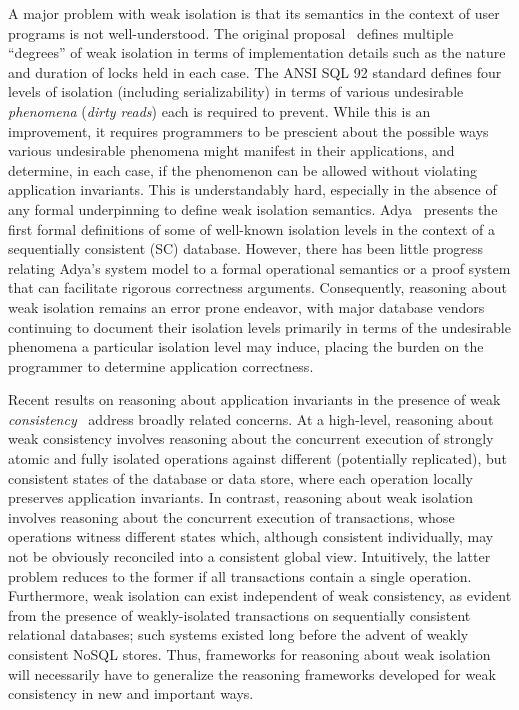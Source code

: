 A major problem with weak isolation is that its semantics in the
context of user programs is not well-understood. The original
proposal~\cite{gray1976} defines multiple ``degrees'' of weak
isolation in terms of implementation details such as the nature and
duration of locks held in each case. The ANSI SQL 92 standard defines
four levels of isolation (including serializability) in terms of
various undesirable \emph{phenomena} (\eg \emph{dirty reads}) each is
required to prevent. While this is an improvement, it requires
programmers to be prescient about the possible ways various
undesirable phenomena might manifest in their applications, and
determine, in each case, if the phenomenon can be allowed without
violating application invariants. This is understandably hard,
especially in the absence of any formal underpinning to define weak
isolation semantics.  Adya~\cite{adyaphd} presents the first formal
definitions of some of well-known isolation levels in the context of a
sequentially consistent (SC) database.  However, there has been little
progress relating Adya's system model to a formal operational
semantics or a proof system that can facilitate rigorous correctness
arguments.  Consequently, reasoning about weak isolation remains an
error prone endeavor, with major database vendors~\cite{postgresiso,
  mysqliso, oracleiso} continuing to document their isolation levels
primarily in terms of the undesirable phenomena a particular isolation
level may induce, placing the burden on the programmer to determine
application correctness.

Recent results on reasoning about application invariants in the
presence of weak \emph{consistency}~\cite{burckhardt14, redblueosdi,
  redblueatc, ecinec, gotsmanpopl16} address broadly related concerns.
At a high-level, reasoning about weak consistency involves reasoning
about the concurrent execution of strongly atomic and fully isolated
operations against different (potentially replicated), but consistent
states of the database or data store, where each operation locally
preserves application invariants. In contrast, reasoning about weak
isolation involves reasoning about the concurrent execution of
transactions, whose operations witness different states which,
although consistent individually, may not be obviously reconciled into
a consistent global view.  Intuitively, the latter problem reduces to
the former if all transactions contain a single
operation. Furthermore, weak isolation can exist independent of weak
consistency, as evident from the presence of weakly-isolated
transactions on sequentially consistent relational databases; such
systems existed long before the advent of weakly consistent NoSQL
stores.  Thus, frameworks for reasoning about weak isolation will
necessarily have to generalize the reasoning frameworks developed for
weak consistency in new and important ways.

